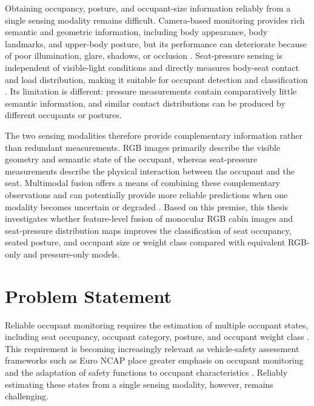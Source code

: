 Obtaining occupancy, posture, and occupant-size information reliably from a single sensing modality remains difficult. Camera-based 
monitoring provides rich semantic and geometric information, including body appearance, body landmarks, and upper-body posture, but
its performance can deteriorate because of poor illumination, glare, shadows, or occlusion \cite{salazar2025dms}. Seat-pressure sensing 
is independent of visible-light conditions and directly measures body-seat contact and load distribution, making it suitable for 
occupant detection and classification \cite{reed2001ocatd}. Its limitation is different: pressure measurements contain comparatively 
little semantic information, and similar contact distributions can be produced by different occupants or postures.

The two sensing modalities therefore provide complementary information rather than redundant measurements. RGB images primarily 
describe the visible geometry and semantic state of the occupant, whereas seat-pressure measurements describe the physical interaction 
between the occupant and the seat. Multimodal fusion offers a means of combining these complementary observations and can potentially 
provide more reliable predictions when one modality becomes uncertain or degraded \cite{ortega2022multimodal}. Based on this premise, 
this thesis investigates whether feature-level fusion of monocular RGB cabin images and seat-pressure distribution maps improves the 
classification of seat occupancy, seated posture, and occupant size or weight class compared with equivalent RGB-only and pressure-only 
models.





\section{Problem Statement}
\label{sec:problem-statement}

Reliable occupant monitoring requires the estimation of multiple occupant states, including seat occupancy, 
occupant category, posture, and occupant weight class . This requirement is becoming increasingly relevant as 
vehicle-safety assessment frameworks such as Euro NCAP place greater emphasis on occupant monitoring and the 
adaptation of safety functions to occupant characteristics \cite{euroncap2026}. Reliably estimating these states 
from a single sensing modality, however, remains challenging.

